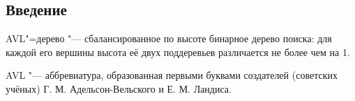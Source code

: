 \begin{frame}
    \section{Введение}
    
    AVL"=дерево "--- сбалансированное по высоте бинарное дерево поиска:
    для каждой его вершины высота её двух поддеревьев различается не более чем на 1.

    AVL "--- аббревиатура, образованная первыми буквами создателей
    (советских учёных) Г. М. Адельсон-Вельского и Е. М. Ландиса.
\end{frame}